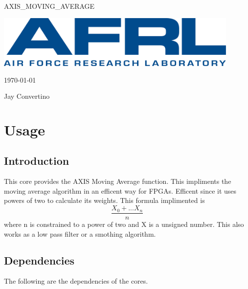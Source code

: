 \begin{titlepage}
  \begin{center}

  {\Huge AXIS\_MOVING\_AVERAGE}

  \vspace{25mm}

  \includegraphics[width=0.90\textwidth,height=\textheight,keepaspectratio]{img/AFRL.png}

  \vspace{25mm}

  \today

  \vspace{15mm}

  {\Large Jay Convertino}

  \end{center}
\end{titlepage}

\tableofcontents

\newpage

\section{Usage}

\subsection{Introduction}

\par
This core provides the AXIS Moving Average function. This impliments the moving average algorithm in an efficent way for FPGAs.
Efficent since it uses powers of two to calculate its weights. This formula implimented is \[\frac{X_{0} + ... X_{n}}{n}\] where n is constrained
to a power of two and X is a unsigned number. This also works as a low pass filter or a smothing algorithm.

\subsection{Dependencies}

\par
The following are the dependencies of the cores.

